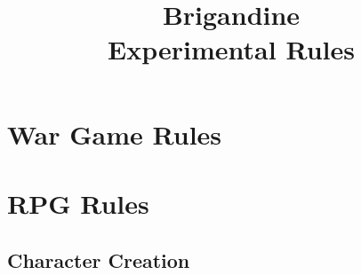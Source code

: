 \documentclass[openany, notitlepage]{book}
\title{\Huge Brigandine\\\Large Experimental Rules}
\author{}
\date{}
\begin{document}
\maketitle

\tableofcontents

\part{War Game Rules}


\part{RPG Rules}

\chapter{Character Creation}
\end{document}

